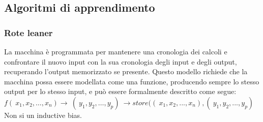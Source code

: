 \subsection{Algoritmi di apprendimento}
\subsubsection{Rote leaner}
La macchina è programmata per mantenere una cronologia dei calcoli e confrontare il nuovo input con la sua cronologia degli input e degli output, recuperando l'output memorizzato se presente. Questo modello richiede che la macchina possa essere modellata come una funzione, producendo sempre lo stesso output per lo stesso input, e può essere formalmente descritto come segue: \\
$ f({\displaystyle \ x_{1},x_{2}, \dots ,x_{n}})\to \ ({\displaystyle \ y_{1},y_{2},\dots ,y_{p}})\ \to store (({\displaystyle \ x_{1},x_{2},...,x_{n}}),({\displaystyle \ y_{1},y_{2},...,y_{p}})$
Non si un inductive bias. 
